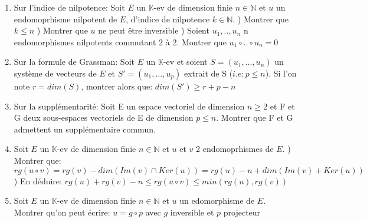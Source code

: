 \documentclass[11pt]{article}
\newenvironment{qparts}{\begin{enumerate}[{(}a{)}]}{\end{enumerate}}
\begin{document}
\begin{qparts}
) Soit $f\in L(\mathbb{R}^3)$ telle que: $f^2=0$ et $f\neq 0$. Montrer que f est de rang 1

\item{Sur l’indice de nilpotence:}
\subitem Soit $E$ un $\mathbb{K}$-ev de dimension finie $n\in\mathbb{N}$ et $u$ un endomoprhisme nilpotent de $E$, d'indice de nilpotence $k\in\mathbb{N}$.
) Montrer que $k\leq n$
) Montrer que $u$ ne peut être inversible
) Soient $u_1,..,u_n$ n endomorphismes nilpotents commutant 2 à 2. Montrer que $u_1\circ ..\circ u_n=0$

\item{Sur la formule de Grassman:}
\subitem
Soit $E$ un $\mathbb{K}$-ev et soient $S=(u_1,...,u_n)$ un système de vecteurs de $E$ et $S'=(u_1,...,u_p)$ extrait de S ($i.e: p\leq n$). Si l'on note $r=dim(S)$, montrer alors que: $dim(S')\geq r+p-n$

\item{Sur la supplémentarité:}
\subitem 
Soit E un espace vectoriel de dimension $n\geq 2$ et F et G deux sous-espaces vectoriels de E de dimension $p\leq n$.
Montrer que F et G admettent un supplémentaire commun.

\item Soit $E$ un $\mathbb{K}$-ev de dimension finie $n\in\mathbb{N}$ et $u$ et $v$ 2 endomoprhismes de $E$. 
) Montrer que: $rg(u\circ v)= rg(v)-dim(Im(v)\cap Ker(u))=rg(u)-n+dim(Im(v)+Ker(u))$
) En déduire: $rg(u)+rg(v)-n\leq rg(u\circ v)\leq min(rg(u),rg(v))$

\item Soit $E$ un $\mathbb{K}$-ev de dimension finie $n\in\mathbb{N}$ et $u$ un edomorphisme de $E$. Montrer qu'on peut écrire: $u=g\circ p$ avec $g$ inversible et $p$ projecteur


\end{qparts}
\end{document}
